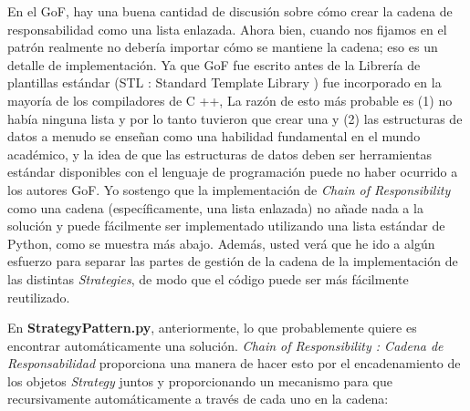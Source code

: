 \documentclass{article}
\begin{document}
En el GoF, hay una buena cantidad de discusión sobre cómo crear la cadena de responsabilidad como una lista enlazada. Ahora bien, cuando nos fijamos en el patrón realmente no debería importar cómo se mantiene la cadena; eso es un detalle de implementación. Ya que GoF fue escrito antes de la Librería de plantillas estándar (STL :  Standard Template Library ) fue incorporado en la mayoría de los compiladores de C ++, La razón de esto más probable es (1) no había ninguna lista y por lo tanto tuvieron que crear una y (2) las estructuras de datos a menudo se enseñan como una habilidad fundamental en el mundo académico, y la idea de que las estructuras de datos deben ser herramientas estándar disponibles con el lenguaje de programación puede no haber ocurrido a los autores GoF. Yo sostengo que la implementación de \textit{Chain of Responsibility} como una cadena  (específicamente, una lista enlazada) no añade nada a la solución y puede fácilmente ser implementado utilizando una lista estándar de Python, como se muestra más abajo. Además, usted verá que he ido a algún esfuerzo para separar las partes de gestión de la cadena de la implementación de las distintas \textit{Strategies}, de modo que el código puede ser más fácilmente reutilizado.    \newline


En \textbf{StrategyPattern.py}, anteriormente, lo que probablemente quiere es encontrar automáticamente una solución. \textit{Chain of Responsibility : Cadena de Responsabilidad} proporciona una manera de hacer esto por el encadenamiento de los objetos \textit{Strategy} juntos y proporcionando un mecanismo para que recursivamente automáticamente a través de cada uno en la cadena:     \newline
\end{document}

